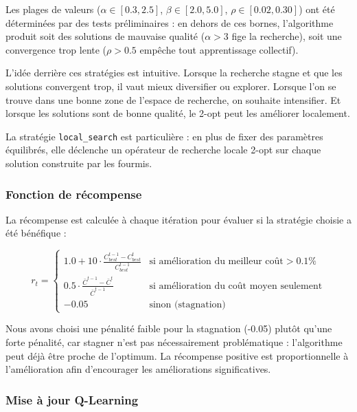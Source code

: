 \documentclass[12pt, a4paper]{article}
\begin{document}
Les plages de valeurs ($\alpha \in [0.3, 2.5]$, $\beta \in [2.0, 5.0]$, $\rho \in [0.02, 0.30]$) ont été déterminées par des tests préliminaires : en dehors de ces bornes, l'algorithme produit soit des solutions de mauvaise qualité ($\alpha > 3$ fige la recherche), soit une convergence trop lente ($\rho > 0.5$ empêche tout apprentissage collectif).

L'idée derrière ces stratégies est intuitive. Lorsque la recherche stagne et que les solutions convergent trop, il vaut mieux diversifier ou explorer. Lorsque l'on se trouve dans une bonne zone de l'espace de recherche, on souhaite intensifier. Et lorsque les solutions sont de bonne qualité, le 2-opt peut les améliorer localement.

La stratégie \texttt{local\_search} est particulière : en plus de fixer des paramètres équilibrés, elle déclenche un opérateur de recherche locale 2-opt sur chaque solution construite par les fourmis.

\subsubsection{Fonction de récompense}

La récompense est calculée à chaque itération pour évaluer si la stratégie choisie a été bénéfique :

\begin{equation}
    r_t = \begin{cases}
        1.0 + 10 \cdot \frac{C_{best}^{t-1} - C_{best}^{t}}{C_{best}^{t-1}} & \text{si amélioration du meilleur coût} > 0.1\% \\
        0.5 \cdot \frac{\bar{C}^{t-1} - \bar{C}^{t}}{\bar{C}^{t-1}} & \text{si amélioration du coût moyen seulement} \\
        -0.05 & \text{sinon (stagnation)}
    \end{cases}
\end{equation}

Nous avons choisi une pénalité faible pour la stagnation (-0.05) plutôt qu'une forte pénalité, car stagner n'est pas nécessairement problématique : l'algorithme peut déjà être proche de l'optimum. La récompense positive est proportionnelle à l'amélioration afin d'encourager les améliorations significatives.

\subsubsection{Mise à jour Q-Learning}
\end{document}
